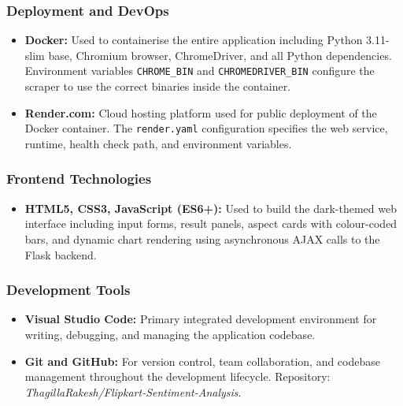 \documentclass[12pt,a4paper]{report}
\begin{document}
\subsubsection*{Deployment and DevOps}

\begin{itemize}
  \item \textbf{Docker:} Used to containerise the entire application including Python 3.11-slim base, Chromium browser, ChromeDriver, and all Python dependencies. Environment variables \texttt{CHROME\_BIN} and \texttt{CHROMEDRIVER\_BIN} configure the scraper to use the correct binaries inside the container.

  \item \textbf{Render.com:} Cloud hosting platform used for public deployment of the Docker container. The \texttt{render.yaml} configuration specifies the web service, runtime, health check path, and environment variables.
\end{itemize}

\subsubsection*{Frontend Technologies}

\begin{itemize}
  \item \textbf{HTML5, CSS3, JavaScript (ES6+):} Used to build the dark-themed web interface including input forms, result panels, aspect cards with colour-coded bars, and dynamic chart rendering using asynchronous AJAX calls to the Flask backend.
\end{itemize}

\subsubsection*{Development Tools}

\begin{itemize}
  \item \textbf{Visual Studio Code:} Primary integrated development environment for writing, debugging, and managing the application codebase.

  \item \textbf{Git and GitHub:} For version control, team collaboration, and codebase management throughout the development lifecycle. Repository: \textit{ThagillaRakesh/Flipkart-Sentiment-Analysis}.
\end{itemize}

\end{document}
